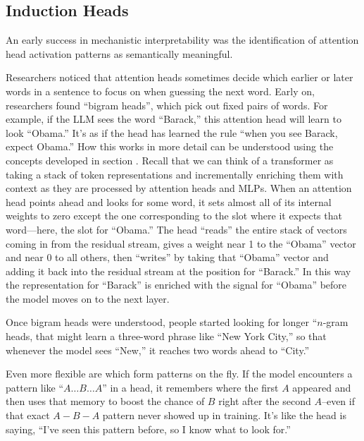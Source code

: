 \subsection{Induction Heads}


An early success in mechanistic interpretability was the identification of attention head activation patterns as semantically meaningful. 

Researchers noticed that attention heads sometimes decide which earlier or later words in a sentence to focus on when guessing the next word. Early on, researchers found ``bigram heads'',  which pick out fixed pairs of words. For example, if the LLM sees the word ``Barack,'' this attention head will learn to look ``Obama.'' It’s as if the head has learned the rule ``when you see Barack, expect Obama.'' How this works in more detail can be understood using the concepts developed in section . Recall that we can think of a transformer as taking a stack of token representations and incrementally enriching them with context as they are processed by attention heads and MLPs. When an attention head points ahead and looks for some word, it sets almost all of its internal weights to zero except the one corresponding to the slot where it expects that word—here, the slot for ``Obama.'' The head ``reads'' the entire stack of vectors coming in from the residual stream, gives a weight near 1 to the ``Obama'' vector and near 0 to all others, then ``writes'' by taking that “Obama” vector and adding it back into the residual stream at the position for ``Barack.'' In this way the representation for “Barack” is enriched with the signal for “Obama” before the model moves on to the next layer.  

Once bigram heads were understood, people started looking for longer ``$n$-gram heads, that might learn a three-word phrase like “New York City,'' so that whenever the model sees ``New,'' it reaches two words ahead to ``City.''

Even more flexible are  which form patterns on the fly. If the model encounters a pattern like ``$A \ldots B \ldots A$'' in a head, it remembers where the first $A$ appeared and then uses that memory to boost the chance of $B$ right after the second $A$--even if that exact $A-B-A$ pattern never showed up in training. It’s like the head is saying, ``I’ve seen this pattern before, so I know what to look for.''

